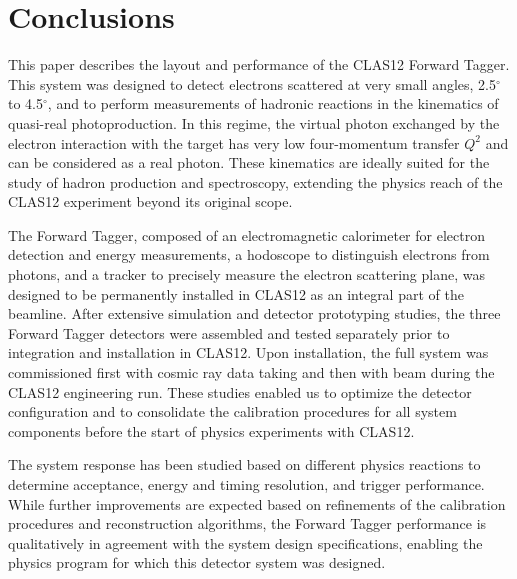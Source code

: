 \section{Conclusions}

This paper describes the layout and performance of the CLAS12 Forward Tagger. This system was designed to detect
electrons scattered at very small angles, 2.5$^\circ$ to 4.5$^\circ$, and to perform measurements of hadronic reactions
in the kinematics of quasi-real photoproduction. In this regime, the virtual photon exchanged by the electron
interaction with the target has very low four-momentum transfer $Q^2$ and can be considered as a real photon. These
kinematics are ideally suited for the study of hadron production and spectroscopy,  extending the physics reach of the
CLAS12 experiment beyond its original scope.

The Forward Tagger, composed of an electromagnetic calorimeter for electron detection and energy measurements,
a hodoscope to distinguish electrons from photons, and a tracker to precisely measure the electron scattering plane,
was designed to be permanently installed in CLAS12 as an integral part of the beamline. After extensive simulation
and detector prototyping studies, the three Forward Tagger detectors were assembled and tested separately prior
to integration and installation in CLAS12. Upon installation, the full system was commissioned first with cosmic ray
data taking and then with beam during the CLAS12 engineering run. These studies enabled us to optimize the detector
configuration and to consolidate the calibration procedures for all system components before the start of physics
experiments with CLAS12.

The system response has been studied based on different physics reactions to determine acceptance, energy and
timing resolution, and trigger performance. While further improvements are expected based on refinements of the
calibration procedures and reconstruction algorithms, the Forward Tagger performance is qualitatively in agreement
with the system design specifications, enabling the physics program for which this detector system was designed.
 
